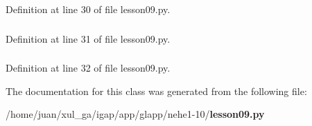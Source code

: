 Definition at line 30 of file lesson09.py.
\subsubsection{}\label{classlesson09_1_1star_a425379264e17f267cf0406b133feef3}




Definition at line 31 of file lesson09.py.
\subsubsection{}\label{classlesson09_1_1star_568b5315c3757aaf17738dd23d8d02e5}




Definition at line 32 of file lesson09.py.

The documentation for this class was generated from the following file:\begin{CompactItemize}
\item 
/home/juan/xul\_\-ga/igap/app/glapp/nehe1-10/{\bf lesson09.py}\end{CompactItemize}

